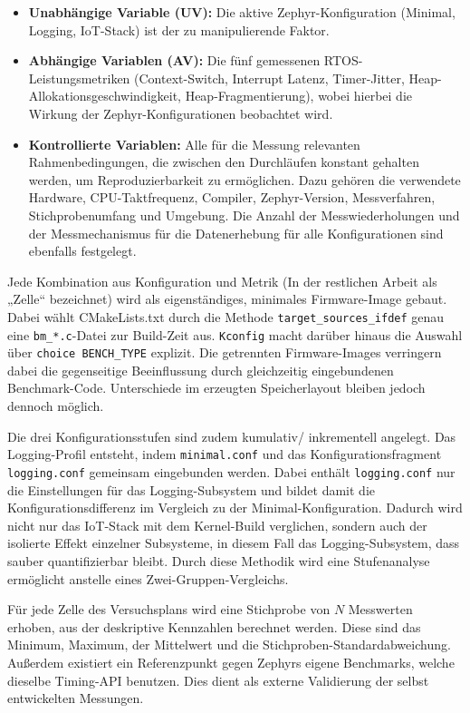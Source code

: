 \begin{itemize}
\item \textbf{Unabhängige Variable (UV):} Die aktive Zephyr-Konfiguration (Minimal, Logging, IoT-Stack) ist der zu manipulierende Faktor.
\item \textbf{Abhängige Variablen (AV):} Die fünf gemessenen RTOS-Leistungsmetriken (Context-Switch, Interrupt Latenz, Timer-Jitter, Heap-Allokationsgeschwindigkeit, Heap-Fragmentierung), wobei hierbei die Wirkung der Zephyr-Konfigurationen beobachtet wird.
\item \textbf{Kontrollierte Variablen:} Alle für die Messung relevanten Rahmenbedingungen, die zwischen den Durchläufen konstant gehalten werden, um Reproduzierbarkeit zu ermöglichen. Dazu gehören die verwendete Hardware, CPU-Taktfrequenz, Compiler, Zephyr-Version, Messverfahren, Stichprobenumfang und Umgebung. Die Anzahl der Messwiederholungen und der Messmechanismus für die Datenerhebung für alle Konfigurationen sind ebenfalls festgelegt.
\end{itemize}
Jede Kombination aus Konfiguration und Metrik (In der restlichen Arbeit als „Zelle“ bezeichnet) wird als eigenständiges, minimales Firmware-Image gebaut. Dabei wählt CMakeLists.txt durch die Methode \lstinline[style=fileinline]|target_sources_ifdef| genau eine \lstinline[style=fileinline]|bm_*.c|-Datei zur Build-Zeit aus. \lstinline[style=fileinline]|Kconfig| macht darüber hinaus die Auswahl über \lstinline[style=fileinline]|choice BENCH_TYPE| explizit. Die getrennten Firmware-Images verringern dabei die gegenseitige Beeinflussung durch gleichzeitig eingebundenen Benchmark-Code. Unterschiede im erzeugten Speicherlayout bleiben jedoch dennoch möglich.

Die drei Konfigurationsstufen sind zudem kumulativ/ inkrementell angelegt. Das Logging-Profil entsteht, indem \lstinline[style=fileinline]|minimal.conf| und das Konfigurationsfragment \lstinline[style=fileinline]|logging.conf| gemeinsam eingebunden werden. Dabei enthält \lstinline[style=fileinline]|logging.conf| nur die Einstellungen für das Logging-Subsystem und bildet damit die Konfigurationsdifferenz im Vergleich zu der Minimal-Konfiguration. Dadurch wird nicht nur das IoT-Stack mit dem Kernel-Build verglichen, sondern auch der isolierte Effekt einzelner Subsysteme, in diesem Fall das Logging-Subsystem, dass sauber quantifizierbar bleibt. Durch diese Methodik wird eine Stufenanalyse ermöglicht anstelle eines Zwei-Gruppen-Vergleichs.

Für jede Zelle des Versuchsplans wird eine Stichprobe von \(N\) Messwerten erhoben, aus der deskriptive Kennzahlen berechnet werden. Diese sind das Minimum, Maximum, der Mittelwert und die Stichproben-Standardabweichung. Außerdem existiert ein Referenzpunkt gegen Zephyrs eigene Benchmarks, welche dieselbe Timing-API benutzen. Dies dient als externe Validierung der selbst entwickelten Messungen.

